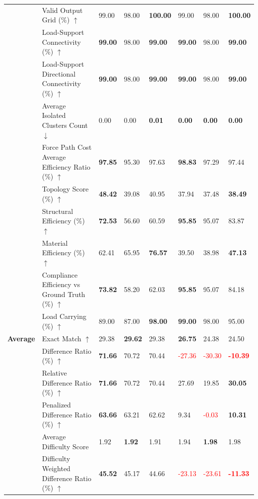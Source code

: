 \begin{table}[!h]
{\begin{tabular}{lllll|lll}
 & Valid Output Grid (\%) $\uparrow$ & 99.00 & 98.00 & \textbf{100.00} & 99.00 & 98.00 & \textbf{100.00} \\
 & Load-Support Connectivity (\%) $\uparrow$ & \textbf{99.00} & 98.00 & \textbf{99.00} & \textbf{99.00} & 98.00 & \textbf{99.00} \\
 & Load-Support Directional Connectivity (\%) $\uparrow$ & \textbf{99.00} & 98.00 & \textbf{99.00} & \textbf{99.00} & 98.00 & \textbf{99.00} \\
 & Average Isolated Clusters Count $\downarrow$ & 0.00 & 0.00 & \textbf{0.01} & \textbf{0.00} & \textbf{0.00} & \textbf{0.00} \\
 & Force Path Cost Average Efficiency Ratio (\%) $\uparrow$ & \textbf{97.85} & 95.30 & 97.63 & \textbf{98.83} & 97.29 & 97.44 \\
 & Topology Score (\%) $\uparrow$ & \textbf{48.42} & 39.08 & 40.95 & 37.94 & 37.48 & \textbf{38.49} \\
 & Structural Efficiency (\%) $\uparrow$ & \textbf{72.53} & 56.60 & 60.59 & \textbf{95.85} & 95.07 & 83.87 \\
 & Material Efficiency (\%) $\uparrow$ & 62.41 & 65.95 & \textbf{76.57} & 39.50 & 38.98 & \textbf{47.13} \\
 & Compliance Efficiency vs Ground Truth (\%) $\uparrow$ & \textbf{73.82} & 58.20 & 62.03 & \textbf{95.85} & 95.07 & 84.18 \\
 & Load Carrying (\%) $\uparrow$ & 89.00 & 87.00 & \textbf{98.00} & \textbf{99.00} & 98.00 & 95.00 \\
\midrule
\textbf{Average} & Exact Match $\uparrow$ & 29.38 & \textbf{29.62} & 29.38 & \textbf{26.75} & 24.38 & 24.50 \\
 & Difference Ratio (\%) $\uparrow$ & \textbf{71.66} & 70.72 & 70.44 & \textcolor{red}{-27.36} & \textcolor{red}{-30.30} & \textbf{\textcolor{red}{-10.39}} \\
 & Relative Difference Ratio (\%) $\uparrow$ & \textbf{71.66} & 70.72 & 70.44 & 27.69 & 19.85 & \textbf{30.05} \\
 & Penalized Difference Ratio (\%) $\uparrow$ & \textbf{63.66} & 63.21 & 62.62 & 9.34 & \textcolor{red}{-0.03} & \textbf{10.31} \\
 & Average Difficulty Score & 1.92 & \textbf{1.92} & 1.91 & 1.94 & \textbf{1.98} & 1.98 \\
 & Difficulty Weighted Difference Ratio (\%) $\uparrow$ & \textbf{45.52} & 45.17 & 44.66 & \textcolor{red}{-23.13} & \textcolor{red}{-23.61} & \textbf{\textcolor{red}{-11.33}} \\

\end{tabular}}
\end{table}
